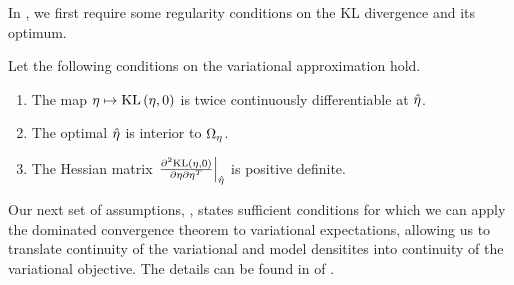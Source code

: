 In , we first require some regularity conditions on the KL
divergence and its optimum.

\begin{assu}
%
Let the following conditions on the variational approximation hold.
%
\begin{enumerate}
%
    \item {} The map $\eta \mapsto \mathrm{KL}\left(\eta, 0\right)$ is twice
    continuously differentiable at $\hat\eta$.

    \item {} The optimal $\hat\eta$ is interior
    to $\Omega_{\eta}$.

    \item{} The Hessian matrix $\left.\frac{\partial^2 \mathrm{KL}\left(\eta,
    0\right)}{\partial \eta \partial \eta^T}\right\vert_{\hat\eta}$ is positive definite.
%
\end{enumerate}
%
\end{assu}

Our next set of assumptions, , states sufficient
conditions for which we can apply the dominated convergence theorem to
variational expectations, allowing us to translate continuity of the variational
and model densitites into continuity of the variational objective.  The details
can be found in  of .

